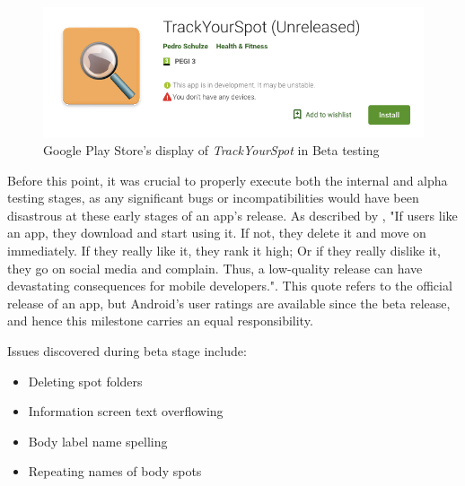 \begin{figure}[H]
    \includegraphics[width=1.2\textwidth, center]{figures/betarelease.png}
    \caption{Google Play Store's display of \emph{TrackYourSpot} in Beta testing}
    \label{fig:betarelease}
\end{figure}

Before this point, it was crucial to properly execute both the internal and alpha testing stages, as any significant bugs or incompatibilities would have been disastrous at these early stages of an app's release. As described by \cite{joorabchi2013real}, "If users like an app, they download and start using it. If not, they delete it and move on immediately. If they really like it, they rank it high; Or if they really dislike it, they go on social media and complain. Thus, a low-quality release can have devastating consequences for mobile developers.". This quote refers to the official release of an app, but Android's user ratings are available since the beta release, and hence this milestone carries an equal responsibility.

Issues discovered during beta stage include: 
\begin{itemize}
    \item Deleting spot folders
    \item Information screen text overflowing
    \item Body label name spelling
    \item Repeating names of body spots
\end{itemize}

